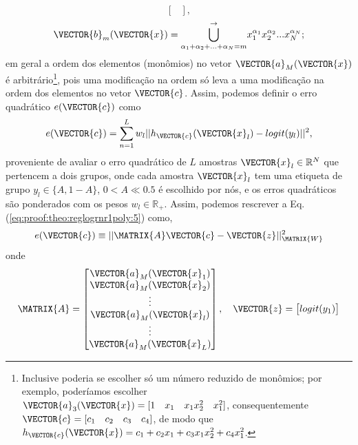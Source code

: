 \begin{myproofT}
\begin{equation}
\begin{bmatrix}
\end{bmatrix},
\end{equation}
\begin{equation}\label{eq:proof:theo:reglogrnr1poly:4}
\VECTOR{b}_m(\VECTOR{x})=
{\bigcup\limits_{\alpha_1+\alpha_2+...+\alpha_N=m}^{\rightarrow}}{x_1^{\alpha_1} x_2^{\alpha_2} ... x_N^{\alpha_N}};
\end{equation}
em geral a ordem dos elementos (monômios) no vetor $\VECTOR{a}_M(\VECTOR{x})$ 
é arbitrário\footnote{Inclusive poderia se escolher só um número reduzido de monômios;
por exemplo, poderíamos escolher $\VECTOR{a}_3(\VECTOR{x})=[1\quad x_1\quad x_1 x_2^2\quad x_1^2]$,
consequentemente $\VECTOR{c}=[c_1\quad c_2\quad c_3\quad c_4]$,
de modo que $h_{\VECTOR{c}}(\VECTOR{x})=c_1 +c_2 x_1+c_3 x_1 x_2^2+c_4 x_1^2$.}, 
pois uma modificação na ordem só leva a uma modificação na ordem dos elementos no vetor $\VECTOR{c}$.
Assim, podemos definir o erro quadrático $e(\VECTOR{c})$ como
\begin{equation}\label{eq:proof:theo:reglogrnr1poly:5}
e(\VECTOR{c}) =  \sum_{n=1}^{L} w_l||h_{\VECTOR{c}}(\VECTOR{x}_l)-logit(y_l)||^2,
\end{equation}
proveniente de avaliar o erro quadrático de $L$ amostras $\VECTOR{x}_l \in \mathbb{R}^{N}$ que pertencem a dois grupos, 
onde cada amostra $\VECTOR{x}_l$ tem uma etiqueta de grupo $y_l\in \{A,1-A\}$, 
 $0<A\ll 0.5$ é escolhido por nós, 
e os erros quadráticos são ponderados com os pesos $w_l \in \mathbb{R}_+$.
Assim, podemos rescrever a Eq. (\ref{eq:proof:theo:reglogrnr1poly:5}) como,
\begin{equation}\label{eq:proof:theo:reglogrnr1poly:6}
e(\VECTOR{c}) \equiv ||\MATRIX{A}\VECTOR{c}-\VECTOR{z}||_{\MATRIX{W}}^2 
\end{equation}
onde
\begin{equation}\label{eq:proof:reglogrnr1poly:7}
\MATRIX{A}=\begin{bmatrix}
\VECTOR{a}_M(\VECTOR{x}_1)\\
\VECTOR{a}_M(\VECTOR{x}_2)\\
\vdots\\
\VECTOR{a}_M(\VECTOR{x}_l)\\
\vdots\\
\VECTOR{a}_M(\VECTOR{x}_L)\\
\end{bmatrix},
\quad
\VECTOR{z}=
\begin{bmatrix}
logit(y_1)  \\

\end{bmatrix}
\end{equation}
\end{myproofT}
